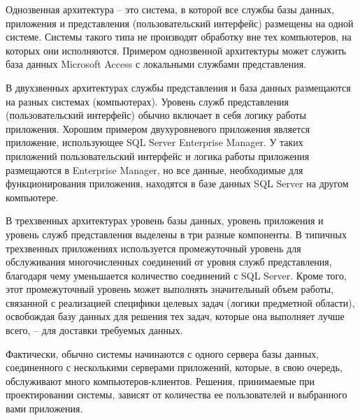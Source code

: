 Однозвенная архитектура – это система, в которой все службы базы данных, приложения и представления (пользовательский интерфейс) размещены на одной системе. Системы такого типа не производят обработку вне тех компьютеров, на которых они исполняются. Примером однозвенной архитектуры может служить база данных Microsoft Access с локальными службами представления.

\bigskip
В двухзвенных архитектурах службы представления и база данных размещаются на разных системах (компьютерах). Уровень служб представления (пользовательский интерфейс) обычно включает в себя логику работы приложения. Хорошим примером двухуровневого приложения является приложение, использующее SQL Server Enterprise Manager. У таких приложений пользовательский интерфейс и логика работы приложения размещаются в Enterprise Manager, но все данные, необходимые для функционирования приложения, находятся в базе данных SQL Server на другом компьютере.

\bigskip
В трехзвенных архитектурах уровень базы данных, уровень приложения и уровень служб представления выделены в три разные компоненты. В типичных трехзвенных приложениях используется промежуточный уровень для обслуживания многочисленных соединений от уровня служб представления, благодаря чему уменьшается количество соединений с SQL Server. Кроме того, этот промежуточный уровень может выполнять значительный объем работы, связанной с реализацией специфики целевых задач (логики предметной области), освобождая базу данных для решения тех задач, которые она выполняет лучше всего, – для доставки требуемых данных.

\bigskip
Фактически, обычно системы начинаются с одного сервера базы данных, соединенного с несколькими серверами приложений, которые, в свою очередь, обслуживают много компьютеров-клиентов. Решения, принимаемые при проектировании системы, зависят от количества ее пользователей и выбранного вами приложения.